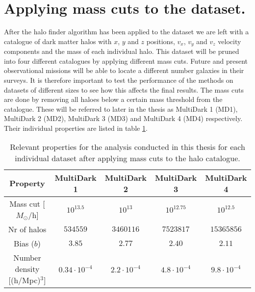 \section{Applying mass cuts to the dataset.}
After the halo finder algorithm has been applied to the dataset we are left with a catalogue of dark matter halos with $x$, $y$ and $z$ positions, $v_x$, $v_y$ and $v_z$ velocity components and the mass of each individual halo. This dataset will be pruned into four different catalogues by applying different mass cuts. Future and present observational missions will be able to locate a different number galaxies in their surveys. It is therefore important to test the performance of the methods on datasets of different sizes to see how this affects the final results. The mass cuts are done by removing all haloes below a certain mass threshold from the catalogue. These will be referred to later in the thesis as MultiDark 1 (MD1), MultiDark 2 (MD2), MultiDark 3 (MD3) and MultiDark 4 (MD4) respectively. Their individual properties are listed in table \ref{tab:MDproperties}.
\begin{table}\label{tab:MDproperties}
    \begin{tabular}{| c | c | c | c | c | }
        \hline
        Property & MultiDark 1 & MultiDark 2 & MultiDark 3 & MultiDark 4 \\
        \hline
        Mass cut [$M_\odot$/h] & $10^{13.5}$ & $10^{13}$ & $10^{12.75}$ & $10^{12.5}$ \\ 
        Nr of halos &$534559$& $3460116$ & $7523817$& $15365856$ \\
        Bias ($b$) & $3.85$ & $2.77$ & $2.40$ & $2.11$ \\
        Number density [(h/Mpc)$^3$] & $0.34\cdot10^{-4}$ & $2.2\cdot10^{-4}$ & $4.8\cdot10^{-4}$ & $9.8\cdot10^{-4}$ \\
        \hline
    \end{tabular}
    \caption{Relevant properties for the analysis conducted in this thesis for each individual dataset after applying mass cuts to the halo catalogue.}
\end{table}
